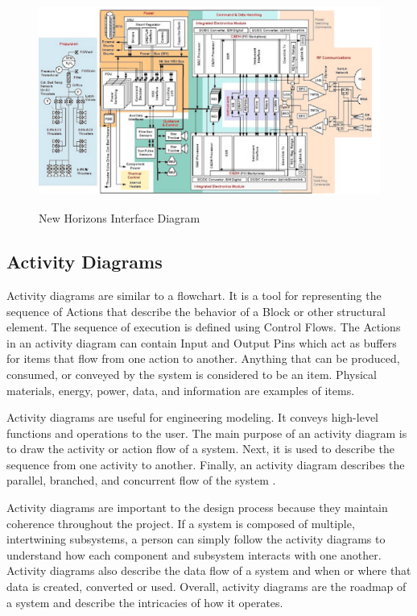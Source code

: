 \begin{figure}[H]
  \begin{center}
  \includegraphics[height=70mm]{Figures/NewHorizons_ID}
  \end{center}
  \caption{New Horizons Interface Diagram\cite{qp11}}
\end{figure}
\subsection{Activity Diagrams}
Activity diagrams are similar to a flowchart.  It is a tool for
representing the sequence of Actions that describe the behavior of a
Block or other structural element. The sequence of execution is
defined using Control Flows. The Actions in an activity diagram can
contain Input and Output Pins which act as buffers for items that flow
from one action to another. Anything that can be produced, consumed,
or conveyed by the system is considered to be an item. Physical
materials, energy, power, data, and information are examples of items\cite{qp12}.

Activity diagrams are useful for engineering modeling.  It conveys
high-level functions and operations to the user. The main purpose of
an activity diagram is to draw the activity or action flow of a
system. Next, it is used to describe the sequence from one activity to
another. Finally, an activity diagram describes the parallel,
branched, and concurrent flow of the system \cite{qp13}.

Activity diagrams are important to the design process because they
maintain coherence throughout the project. If a system is composed of
multiple, intertwining subsystems, a person can simply follow the
activity diagrams to understand how each component and subsystem
interacts with one another. Activity diagrams also describe the data
flow of a system and when or where that data is created, converted or
used. Overall, activity diagrams are the roadmap of a system and
describe the intricacies of how it operates.  

